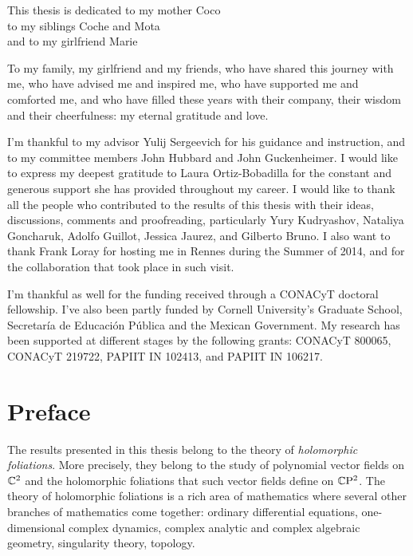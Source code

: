\documentclass[phd,tocprelim]{cornell}
\begin{document}
\cleardoublepage{}
\begin{dedication}
This thesis is dedicated %
to my mother Coco \\
to my siblings Coche and Mota \\
and to my girlfriend Marie
\end{dedication}


\cleardoublepage{}
\begin{acknowledgements}
To my family, my girlfriend and my friends, who have shared this journey with me, who have advised me and inspired me, who have supported me and comforted me, and who have filled these years with their company, their wisdom and their cheerfulness: my eternal gratitude and love.

\bigskip
I'm thankful to my advisor Yulij Sergeevich for his guidance and instruction, and to my committee members John Hubbard and John Guckenheimer.
% 
I would like to express my deepest gratitude to Laura Ortiz-Bobadilla for the constant and generous support she has provided throughout my career.
% 
I would like to thank all the people who contributed to the results of this thesis with their ideas, discussions, comments and proofreading, particularly Yury Kudryashov, Nataliya Goncharuk, Adolfo Guillot, Jessica Jaurez, and Gilberto Bruno.
% 
I also want to thank Frank Loray for hosting me in Rennes during the Summer of 2014, and for the collaboration that took place in such visit. 

\bigskip
I'm thankful as well for the funding received through a CONACyT doctoral fellowship. I've also been partly funded by Cornell University's Graduate School, Secretaría de Educación Pública and the Mexican Government. My research has been supported at different stages by the following grants: CONACyT 800065, CONACyT 219722, PAPIIT IN 102413, and PAPIIT IN 106217.
\end{acknowledgements}


\hypersetup{linkcolor=black}%
\cleardoublepage{}
\contentspage
\hypersetup{linkcolor=red}%


\cleardoublepage{}
{}
\chapter*{Preface}

The results presented in this thesis belong to the theory of \textit{holomorphic foliations}. More precisely, they belong to the study of polynomial vector fields on $\mathbb{C}^2$ and the holomorphic foliations that such vector fields define on $\mathbb{C}\mathrm{P}^2$. The theory of holomorphic foliations is a rich area of mathematics where several other branches of mathematics come together: ordinary differential equations, one-dimensional complex dynamics, complex analytic and complex algebraic geometry, singularity theory, topology. 
\end{document}
